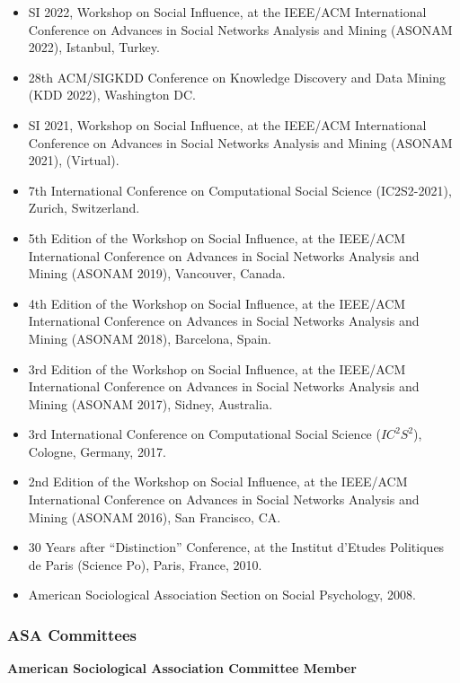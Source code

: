 \documentclass[
]{article}
\providecommand{\tightlist}{%
  \setlength{\itemsep}{0pt}\setlength{\parskip}{0pt}}
\begin{document}
\begin{itemize}
\tightlist
\item
  SI 2022, Workshop on Social Influence, at the IEEE/ACM International
  Conference on Advances in Social Networks Analysis and Mining (ASONAM
  2022), Istanbul, Turkey.
\item
  28th ACM/SIGKDD Conference on Knowledge Discovery and Data Mining (KDD
  2022), Washington DC.
\item
  SI 2021, Workshop on Social Influence, at the IEEE/ACM International
  Conference on Advances in Social Networks Analysis and Mining (ASONAM
  2021), (Virtual).
\item
  7th International Conference on Computational Social Science
  (IC2S2-2021), Zurich, Switzerland.
\item
  5th Edition of the Workshop on Social Influence, at the IEEE/ACM
  International Conference on Advances in Social Networks Analysis and
  Mining (ASONAM 2019), Vancouver, Canada.
\item
  4th Edition of the Workshop on Social Influence, at the IEEE/ACM
  International Conference on Advances in Social Networks Analysis and
  Mining (ASONAM 2018), Barcelona, Spain.
\item
  3rd Edition of the Workshop on Social Influence, at the IEEE/ACM
  International Conference on Advances in Social Networks Analysis and
  Mining (ASONAM 2017), Sidney, Australia.
\item
  3rd International Conference on Computational Social Science
  (\(IC^2S^2\)), Cologne, Germany, 2017.
\item
  2nd Edition of the Workshop on Social Influence, at the IEEE/ACM
  International Conference on Advances in Social Networks Analysis and
  Mining (ASONAM 2016), San Francisco, CA.
\item
  30 Years after ``Distinction'' Conference, at the Institut d'Etudes
  Politiques de Paris (Science Po), Paris, France, 2010.
\item
  American Sociological Association Section on Social Psychology, 2008.
\end{itemize}

\subsubsection{ASA Committees}\label{asa-committees}

\textbf{American Sociological Association Committee Member}
\end{document}
